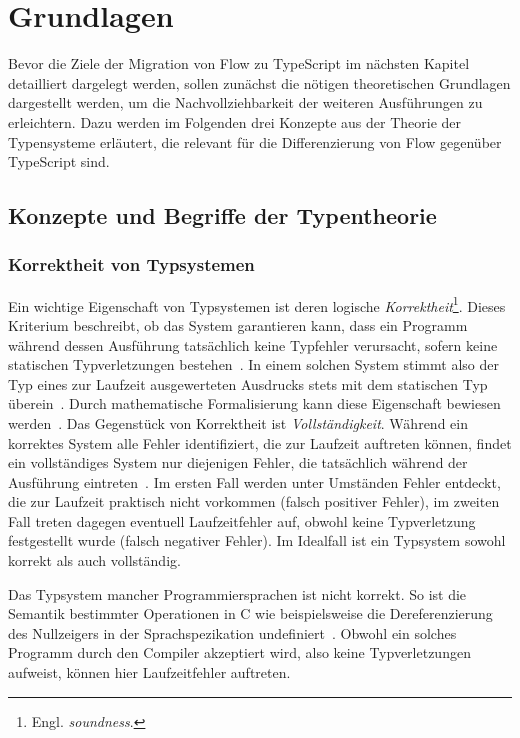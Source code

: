 \chapter{Grundlagen}
\label{chap:basics}

Bevor die Ziele der Migration von Flow zu TypeScript im nächsten Kapitel detailliert dargelegt werden, sollen zunächst die nötigen theoretischen Grundlagen dargestellt werden, um die Nachvollziehbarkeit der weiteren Ausführungen zu erleichtern. Dazu werden im Folgenden drei Konzepte aus der Theorie der Typensysteme erläutert, die relevant für die Differenzierung von Flow gegenüber TypeScript sind.

\section{Konzepte und Begriffe der Typentheorie}

\subsection{Korrektheit von Typsystemen}
Ein wichtige Eigenschaft von Typsystemen ist deren logische \emph{Korrektheit}\footnote{Engl. \textit{soundness}.}. Dieses Kriterium beschreibt, ob das System garantieren kann, dass ein Programm während dessen Ausführung tatsächlich keine Typfehler verursacht, sofern keine statischen Typverletzungen bestehen~\autocite{WRIGHT:1994}. In einem solchen System stimmt also der Typ eines zur Laufzeit ausgewerteten Ausdrucks stets mit dem statischen Typ überein~\autocite{DART:TYPE_SYSTEM}. Durch mathematische Formalisierung kann diese Eigenschaft bewiesen werden~\autocite[7]{CARDELLI:TYPE_SYSTEMS}. Das Gegenstück von Korrektheit ist \textit{Vollständigkeit}. Während ein korrektes System alle Fehler identifiziert, die zur Laufzeit auftreten können, findet ein vollständiges System nur diejenigen Fehler, die tatsächlich während der Ausführung eintreten~\autocite{FLOW:TYPES_AND_EXPRESSIONS}. Im ersten Fall werden unter Umständen Fehler entdeckt, die zur Laufzeit praktisch nicht vorkommen (falsch positiver Fehler), im zweiten Fall treten dagegen eventuell Laufzeitfehler auf, obwohl keine Typverletzung festgestellt wurde (falsch negativer Fehler). Im Idealfall ist ein Typsystem sowohl korrekt als auch vollständig.

Das Typsystem mancher Programmiersprachen ist nicht korrekt. So ist die Semantik bestimmter Operationen in C wie beispielsweise die Dereferenzierung des Nullzeigers in der Sprachspezikation undefiniert~\autocite[79]{ISO:C99}. Obwohl ein solches Programm durch den Compiler akzeptiert wird, also keine Typverletzungen aufweist, können hier Laufzeitfehler auftreten.

